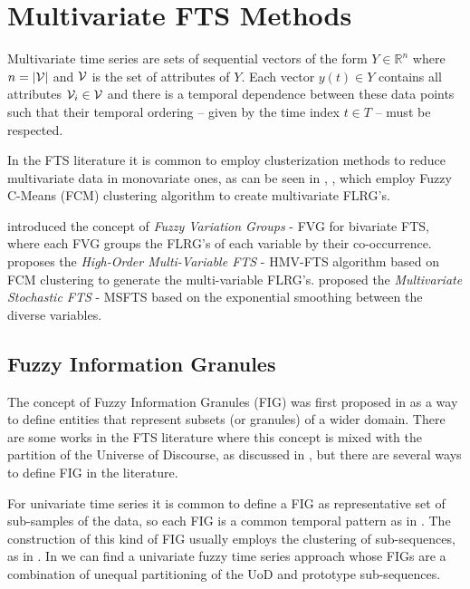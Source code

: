 \section{Multivariate FTS Methods}
\label{sec:fts_multivariate}

Multivariate time series are sets of sequential vectors of the form $Y \in \mathbb{R}^n$ where $n = |\mathcal{V}|$ and $\mathcal{V}$ is the set of attributes of $Y$. Each vector $y(t) \in Y$ contains all attributes $\mathcal{V}_i \in \mathcal{V}$ and there is a temporal dependence between these data points such that their temporal ordering -- given by the time index $t \in T$ -- must be respected. 

In the FTS literature it is common to employ clusterization methods to reduce multivariate data in monovariate ones, as can be seen in \cite{Li2008b}, \cite{Chen2010}, \cite{Sun2015} which employ Fuzzy C-Means (FCM) clustering algorithm to create multivariate FLRG's.

\cite{Chen2011} introduced the concept of \textit{Fuzzy Variation Groups} - FVG for bivariate FTS, where each FVG groups the FLRG's of each variable by their co-occurrence. \cite{Askari2015} proposes the \textit{High-Order Multi-Variable FTS} - HMV-FTS algorithm based on FCM clustering to generate the multi-variable FLRG's. \cite{Jilani2008} proposed the \textit{Multivariate Stochastic FTS} - MSFTS based on the exponential smoothing between the diverse variables.

\subsection{Fuzzy Information Granules}

The concept of Fuzzy Information Granules (FIG) was first proposed in \cite{Zadeh1996} as a way to define entities that represent subsets (or granules) of a wider domain. There are some works in the FTS literature where this concept is mixed with the partition of the Universe of Discourse, as discussed in \cite{Lu2014, Chen2015}, but there are several ways to define FIG in the literature. 

For univariate time series it is common to define a FIG as representative set of sub-samples of the data, so each FIG is a common temporal pattern as in \cite{Yang2017b}. The construction of this kind of FIG usually employs the clustering of sub-sequences, as in \cite{Magalhaes2008}. In \cite{Wang2014a, Wang2015} we can find a univariate fuzzy time series approach whose FIGs are a combination of unequal partitioning of the UoD and prototype sub-sequences. 

